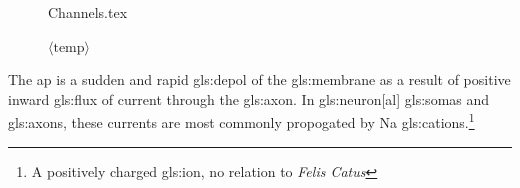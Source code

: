 \documentclass[class={myRUCProject}, crop=false]{standalone}
\begin{document}

\begin{figure}[H]
  \centering
  {Channels.tex}
  \caption{ $\langle \text{temp} \rangle$ }\label{fig:Channels}
\end{figure}

The \gls{ap} is a sudden and rapid \gls{gls:depol} of the \gls{gls:membrane} as a result of positive inward \gls{gls:flux} of current through the \gls{gls:axon}. In \gls{gls:neuron}[al] \glspl{gls:soma} and \glspl{gls:axon}, these currents are most commonly propogated by \gls{Na} \glspl{gls:cation}.{}\footnote{A positively charged \gls{gls:ion}, no relation to \textit{Felis Catus}}
\end{document}
